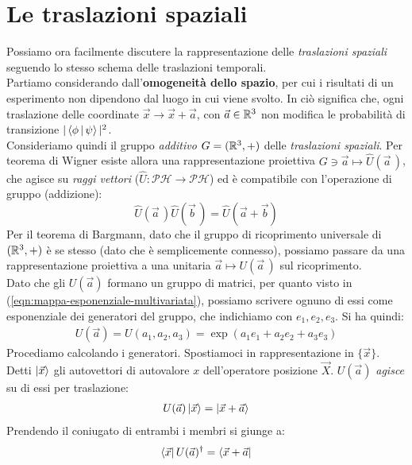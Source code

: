 \documentclass[../../FisicaTeorica.tex]{subfiles}
\begin{document}
\section{Le traslazioni spaziali}
\label{sec:traslazioni_spaziali}
Possiamo ora facilmente discutere la rappresentazione delle \textit{traslazioni spaziali} seguendo lo stesso schema delle traslazioni temporali.\\
Partiamo considerando dall'\textbf{omogeneità dello spazio}, per cui i risultati di un esperimento non dipendono dal luogo in cui viene svolto. In \MQ ciò significa che, ogni traslazione delle coordinate $\vec{x} \to \vec{x}+\vec{a}$, con $\vec{a}\in \mathbb{R}^3$ non modifica le probabilità di transizione $|\Braket{\phi|\psi}|^2$.\\
Consideriamo quindi il gruppo \textit{additivo} $G=(\mathbb{R}^3, +)$ delle \textit{traslazioni spaziali}. 
Per teorema di Wigner esiste allora una rappresentazione proiettiva $G\ni \vec{a} \mapsto \hat{U}(\vec{a}\,)$, che agisce su \textit{raggi vettori} ($\hat{U}:\mathcal{PH}\to\mathcal{PH}$) ed è compatibile con l'operazione di gruppo (addizione):
\begin{equation}
\hat{U}(\vec{a}\,)\hat{U}(\vec{b}\,)=\hat{U}(\vec{a}+\vec{b})
\label{eqn:translation-group-property}
\end{equation}
Per il teorema di Bargmann, dato che il gruppo di ricoprimento universale di $(\mathbb{R}^3,+)$ è se stesso (dato che è semplicemente connesso), possiamo passare da una rappresentazione proiettiva a una unitaria $\vec{a} \mapsto U(\vec{a}\,)$ sul ricoprimento.\\
Dato che gli $U(\vec{a})$ formano un gruppo di matrici, per quanto visto in (\ref{eqn:mappa-esponenziale-multivariata}), possiamo scrivere ognuno di essi come esponenziale dei generatori del gruppo, che indichiamo con $e_1, e_2, e_3$. Si ha quindi:
\begin{align}
U(\vec{a}) = U(a_1, a_2, a_3) = \exp(a_1 e_1 + a_2 e_2 + a_3e_3)
\label{eqn:traslazione-spaziale}
\end{align}
Procediamo calcolando i generatori. Spostiamoci in rappresentazione in $\{\vec{x}\}$. Detti $\Ket{\vec{x}}$ gli autovettori di autovalore $x$ dell'operatore posizione $\vec{X}$. $U(\vec{a})$ \textit{agisce} su di essi per traslazione:
\begin{align*}
U(\vec{a}) \Ket{\vec{x}} = \Ket{\vec{x}+\vec{a}}
\end{align*}
Prendendo il coniugato di entrambi i membri si giunge a:
\begin{align}
\Bra{\vec{x}} U(\vec{a})^\dag =\Bra{\vec{x}+\vec{a}}
\label{eqn:bra-applicated}
\end{align}
\end{document}
